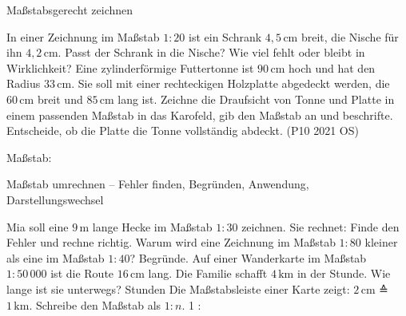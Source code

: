 \begin{aufgabe}{Maßstabsgerecht zeichnen}
\begin{teile}
\begin{ksys}[xmin=0,xmax=10,ymin=0,ymax=6]\end{ksys}
\teil In einer Zeichnung im Maßstab $1 : 20$ ist ein Schrank $4{,}5\,\text{cm}$ breit, die Nische für ihn $4{,}2\,\text{cm}$. Passt der Schrank in die Nische? Wie viel fehlt oder bleibt in Wirklichkeit?
\teil Eine zylinderförmige Futtertonne ist $90\,\text{cm}$ hoch und hat den Radius $33\,\text{cm}$. Sie soll mit einer rechteckigen Holzplatte abgedeckt werden, die $60\,\text{cm}$ breit und $85\,\text{cm}$ lang ist. Zeichne die Draufsicht von Tonne und Platte in einem passenden Maßstab in das Karofeld, gib den Maßstab an und beschrifte. Entscheide, ob die Platte die Tonne vollständig abdeckt. \hfill (P10 2021 OS) \\

\begin{ksys}[xmin=0,xmax=13,ymin=0,ymax=14]\end{ksys}
Maßstab: \leerfeld
\end{teile}
\end{aufgabe}

\begin{aufgabe}{Maßstab umrechnen – Fehler finden, Begründen, Anwendung, Darstellungswechsel}
\begin{teile}
\teil Mia soll eine $9\,\text{m}$ lange Hecke im Maßstab $1 : 30$ zeichnen. Sie rechnet:  Finde den Fehler und rechne richtig.
\teil Warum wird eine Zeichnung im Maßstab $1 : 80$ kleiner als eine im Maßstab $1 : 40$? Begründe.
\teil Auf einer Wanderkarte im Maßstab $1 : 50\,000$ ist die Route $16\,\text{cm}$ lang. Die Familie schafft $4\,\text{km}$ in der Stunde. Wie lange ist sie unterwegs? \leerfeld Stunden
\teil Die Maßstabsleiste einer Karte zeigt: $2\,\text{cm}$ ≙ $1\,\text{km}$. Schreibe den Maßstab als $1 : n$. 1 : \leerfeld
\end{teile}
\end{aufgabe}
